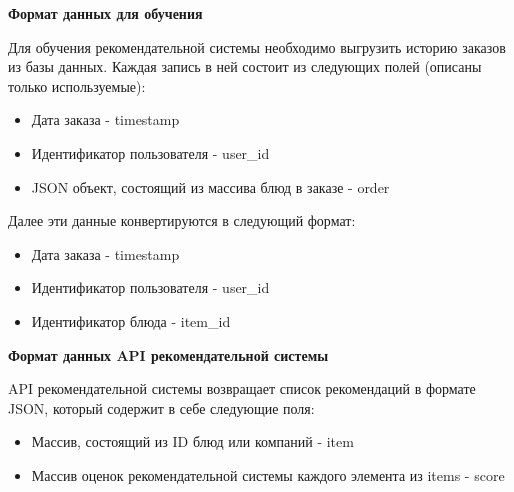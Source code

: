 \textbf{Формат данных для обучения}

Для обучения рекомендательной системы необходимо выгрузить историю заказов из базы
данных. Каждая запись в ней состоит из следующих полей (описаны только используемые):
\begin{itemize}
  \item Дата заказа - timestamp
  \item Идентификатор пользователя - user\_id
  \item JSON объект, состоящий из массива блюд в заказе - order
\end{itemize}
Далее эти данные конвертируются в следующий формат:
\begin{itemize}
  \item Дата заказа - timestamp
  \item Идентификатор пользователя - user\_id
  \item Идентификатор блюда - item\_id
\end{itemize}

\textbf{Формат данных API рекомендательной системы}

API рекомендательной системы возвращает список рекомендаций в формате JSON, который
содержит в себе следующие поля:
\begin{itemize}
  \item Массив, состоящий из ID блюд или компаний - item
  \item Массив оценок рекомендательной системы каждого элемента из items - score
\end{itemize}

